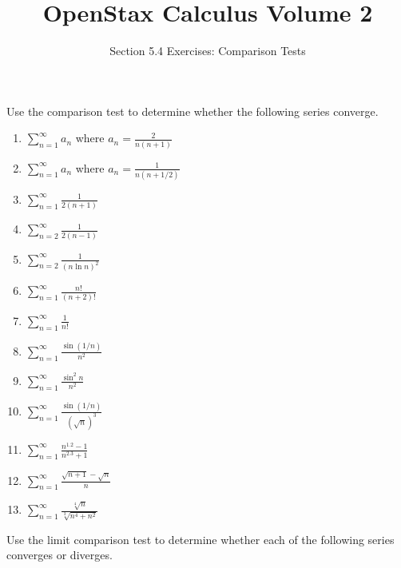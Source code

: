 \documentclass{exercises}
\title{OpenStax Calculus Volume 2}
\subtitle{Section 5.4 Exercises: Comparison Tests}
\author{}
\date{}
\begin{document}
\maketitle


Use the comparison test to determine whether the following series converge.

\begin{enumerate}[start=1]
\item $\sum_{n=1}^{\infty}a_{n}$ where $a_{n}=\frac{2}{n(n+1)}$
\item $\sum_{n=1}^{\infty}a_{n}$ where $a_{n}=\frac{1}{n(n+1/2)}$
\item $\sum_{n=1}^{\infty}\frac{1}{2(n+1)}$
\item $\sum_{n=2}^{\infty}\frac{1}{2(n-1)}$
\item $\sum_{n=2}^{\infty}\frac{1}{{(n\ln n)}^{2}}$
\item $\sum_{n=1}^{\infty}\frac{n!}{(n+2)!}$
\item $\sum_{n=1}^{\infty}\frac{1}{n!}$
\item $\sum_{n=1}^{\infty}\frac{\sin(1/n)}{n^{2}}$
\item $\sum_{n=1}^{\infty}\frac{\sin^{2}n}{n^{2}}$
\item $\sum_{n=1}^{\infty}\frac{\sin(1/n)}{(\sqrt{n})^{3}}$
\item $\sum_{n=1}^{\infty}\frac{n^{1.2}-1}{n^{2.3}+1}$
\item $\sum_{n=1}^{\infty}\frac{\sqrt{n+1}-\sqrt{n}}{n}$
\item $\sum_{n=1}^{\infty}\frac{\sqrt[4]{n}}{\sqrt[3]{n^{4}+n^{2}}}$
\end{enumerate}

Use the limit comparison test to determine whether each of the following series converges or diverges.
\end{document}
